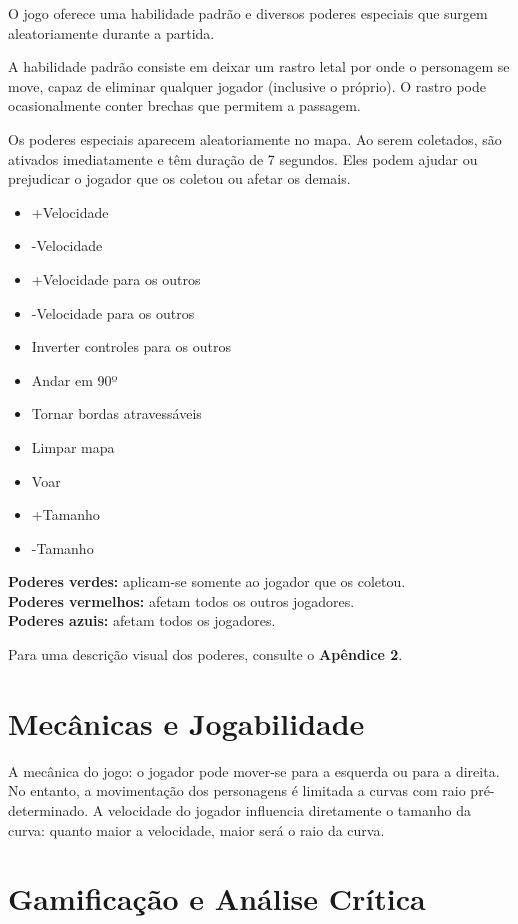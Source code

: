 O jogo oferece uma habilidade padrão e diversos poderes especiais que surgem aleatoriamente durante a partida.

A habilidade padrão consiste em deixar um rastro letal por onde o personagem se move, capaz de eliminar qualquer jogador (inclusive o próprio). O rastro pode ocasionalmente conter brechas que permitem a passagem.

Os poderes especiais aparecem aleatoriamente no mapa. Ao serem coletados, são ativados imediatamente e têm duração de 7 segundos. Eles podem ajudar ou prejudicar o jogador que os coletou ou afetar os demais.

\begin{itemize}
    \item +Velocidade
    \item -Velocidade
    \item +Velocidade para os outros
    \item -Velocidade para os outros
    \item Inverter controles para os outros
    \item Andar em 90º
    \item Tornar bordas atravessáveis
    \item Limpar mapa
    \item Voar
    \item +Tamanho
    \item -Tamanho
\end{itemize}
\textbf{Poderes verdes:} aplicam-se somente ao jogador que os coletou.\\
\textbf{Poderes vermelhos:} afetam todos os outros jogadores.\\
\textbf{Poderes azuis:} afetam todos os jogadores.

Para uma descrição visual dos poderes, consulte o \textbf{Apêndice 2}.

\section{Mecânicas e Jogabilidade}

A mecânica do jogo: o jogador pode mover-se para a esquerda ou para a direita. No entanto, a movimentação dos personagens é limitada a curvas com raio pré-determinado. A velocidade do jogador influencia diretamente o tamanho da curva: quanto maior a velocidade, maior será o raio da curva.

\section{Gamificação e Análise Crítica}


